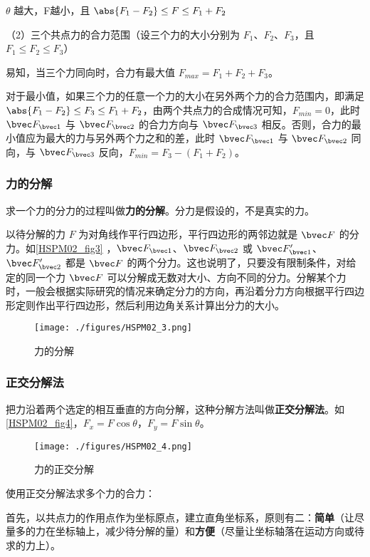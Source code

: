 $\theta$ 越大，F越小，且 $\abs{F_1-F_2}\leq F\leq F_1+F_2$

（2）三个共点力的合力范围（设三个力的大小分别为 $F_1$、$F_2$、$F_3$，且 $F_1\leq F_2 \leq F_3$）

易知，当三个力同向时，合力有最大值 $F_{max}=F_1+F_2+F_3$。

对于最小值，如果三个力的任意一个力的大小在另外两个力的合力范围内，即满足 $\abs{F_1-F_2}\leq F_3\leq F_1+F_2$，由两个共点力的合成情况可知，$F_{min}=0$，此时 $\bvec F_{\bvec 1}$ 与 $\bvec F_{\bvec 2}$ 的合力方向与 $\bvec F_{\bvec 3}$ 相反。否则，合力的最小值应为最大的力与另外两个力之和的差，此时 $\bvec F_{\bvec 1}$ 与 $\bvec F_{\bvec 2}$ 同向，与 $\bvec F_{\bvec 3}$ 反向，$F_{min}=F_3-(F_1+F_2)$。

\subsubsection{力的分解}
求一个力的分力的过程叫做\textbf{力的分解}。分力是假设的，不是真实的力。

以待分解的力 $F$ 为对角线作平行四边形，平行四边形的两邻边就是 $\bvec F$ 的分力。如\autoref{HSPM02_fig3} ，$\bvec F_{\bvec 1}$、$\bvec F_{\bvec 2}$ 或 $\bvec F_{\bvec 1}'$、$\bvec F_{\bvec 2}'$ 都是 $\bvec F$ 的两个分力。这也说明了，只要没有限制条件，对给定的同一个力 $\bvec F$ 可以分解成无数对大小、方向不同的分力。分解某个力时，一般会根据实际研究的情况来确定分力的方向，再沿着分力方向根据平行四边形定则作出平行四边形，然后利用边角关系计算出分力的大小。
\begin{figure}[ht]
\centering
\texttt{[image: ./figures/HSPM02\_3.png]}
\caption{力的分解} \label{HSPM02_fig3}
\end{figure}

\subsubsection{正交分解法}
把力沿着两个选定的相互垂直的方向分解，这种分解方法叫做\textbf{正交分解法}。如\autoref{HSPM02_fig4}，$F_{x}=F\cos\theta$，$F_{y}=F\sin\theta$。
\begin{figure}[ht]
\centering
\texttt{[image: ./figures/HSPM02\_4.png]}
\caption{力的正交分解} \label{HSPM02_fig4}
\end{figure}

使用正交分解法求多个力的合力：

首先，以共点力的作用点作为坐标原点，建立直角坐标系，原则有二：\textbf{简单}（让尽量多的力在坐标轴上，减少待分解的量）和\textbf{方便}（尽量让坐标轴落在运动方向或待求的力上）。

